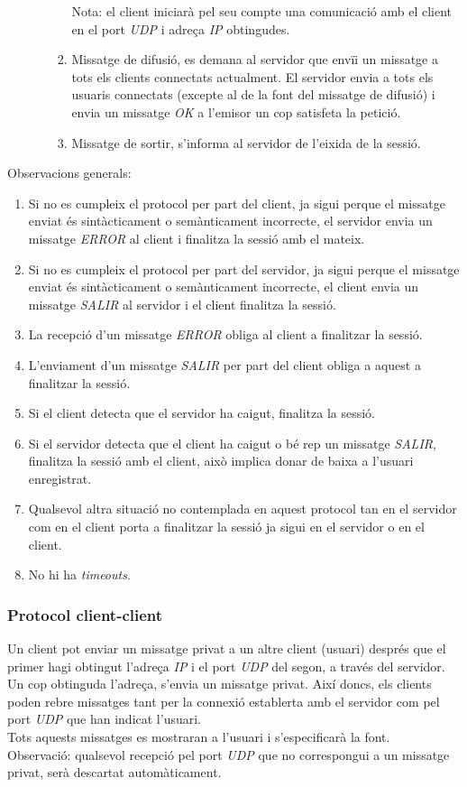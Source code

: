\documentclass[a4paper,10pt]{article}
\begin{document}
\begin{enumerate}
\begin{enumerate}
\begin{enumerate}
					Nota: el client iniciarà pel seu compte una comunicació amb el client en el port \emph{UDP} i adreça \emph{IP} obtingudes.
					\item Missatge de difusió, es demana al servidor que envïi un missatge a tots els clients connectats actualment. El servidor envia a tots els usuaris connectats (excepte al de la font del missatge de difusió) i envia un missatge \emph{OK} a l'emisor un cop satisfeta la petició.
					\item Missatge de sortir, s'informa al servidor de l'eixida de la sessió.
					\end{enumerate}
				\end{enumerate}
			\end{enumerate}
		Observacions generals:
			\begin{enumerate}
 			\item Si no es cumpleix el protocol per part del client, ja sigui perque el missatge enviat és sintàcticament o semànticament incorrecte, el servidor envia un missatge \emph{ERROR} al client i finalitza la sessió amb el mateix.
 			\item Si no es cumpleix el protocol per part del servidor, ja sigui perque el missatge enviat és sintàcticament o semànticament incorrecte, el client envia un missatge \emph{SALIR} al servidor i el client finalitza la sessió.
 			\item La recepció d'un missatge \emph{ERROR} obliga al client a finalitzar la sessió.
 			\item L'enviament d'un missatge \emph{SALIR} per part del client obliga a aquest a finalitzar la sessió.
 			\item Si el client detecta que el servidor ha caigut, finalitza la sessió.
 			\item Si el servidor detecta que el client ha caigut o bé rep un missatge \emph{SALIR}, finalitza la sessió amb el client, això implica donar de baixa a l'usuari enregistrat.
 			\item Qualsevol altra situació no contemplada en aquest protocol tan en el servidor com en el client porta a finalitzar la sessió ja sigui en el servidor o en el client.
 			\item No hi ha \emph{timeouts}.
			\end{enumerate}

		\subsubsection{Protocol client-client}
		Un client pot enviar un missatge privat a un altre client (usuari) després que el primer hagi obtingut l'adreça \emph{IP} i el port \emph{UDP} del segon, a través del servidor. Un cop obtinguda l'adreça, s'envia un missatge privat. Així doncs, els clients poden rebre missatges tant per la connexió establerta amb el servidor com pel port \emph{UDP} que han indicat l'usuari.\\
		Tots aquests missatges es mostraran a l'usuari i s'especificarà la font.\\
		Observació: qualsevol recepció pel port \emph{UDP} que no correspongui a un missatge privat, serà descartat automàticament.
\end{document}
